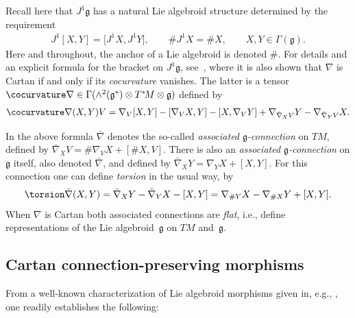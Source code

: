Recall here that $J^1 {\mathfrak g}$ has a natural Lie algebroid
structure determined by the requirement
\begin{gather*}
  J^1[X,Y]=\big[J^1 X,J^1 Y\big],\qquad \# J^1 X = \# X, \qquad X,Y\in\Gamma({\mathfrak g}).%
\end{gather*}
Here and throughout, the anchor of a Lie algebroid is denoted
$\#$. For details and an explicit formula for the bracket on $J^1
{\mathfrak g} $, see~\cite{Blaom_05}, where it is also shown that
$\nabla$ is Cartan if and only if its {\it cocurvature} vanishes. The
latter is a tensor $\cocurvature \nabla \in \Gamma(\wedge^2({\mathfrak
  g}^*)\otimes T^*\!M \otimes {\mathfrak g} )$ def\/ined by
\begin{gather*}
    \cocurvature\nabla ( X, Y)V=\nabla_V[X, Y]-[\nabla_VX,
    Y]-[X,\nabla_VY] +\nabla_{\bar\nabla_XV}Y-\nabla_{\bar\nabla_YV}X.
\end{gather*}

In the above formula $\bar\nabla$ denotes the so-called {\it
  associated ${\mathfrak g}$-connection} on $TM$, def\/ined by
$\bar\nabla_XV=\#\nabla_VX +[\#X,V]$. There is also an {\it associated
  ${\mathfrak g}$-connection} on $\mathfrak g$ itself, also denoted
$\bar\nabla$, and def\/ined by $\bar\nabla_XY=\nabla_YX+[X,Y]$. For this
connection one can def\/ine {\it torsion} in the usual way, by
\begin{gather*}
  \torsion \bar\nabla (X,Y) =
  \bar\nabla_XY-\bar\nabla_YX-[X,Y]=\nabla_{\#Y}X-\nabla_{\#X}Y+[X,Y].
\end{gather*}
When $\nabla $ is Cartan both associated connections are {\em flat},
i.e., def\/ine representations of the Lie algebroid~$\mathfrak g$ on
$TM$ and~${\mathfrak g} $.

\subsection{Cartan connection-preserving morphisms}\label{preserve}

From a well-known characterization of Lie algebroid morphisms given
in, e.g., \cite[Proposition~4.3.12]{Mackenzie_05}, one readily
establishes the following:

